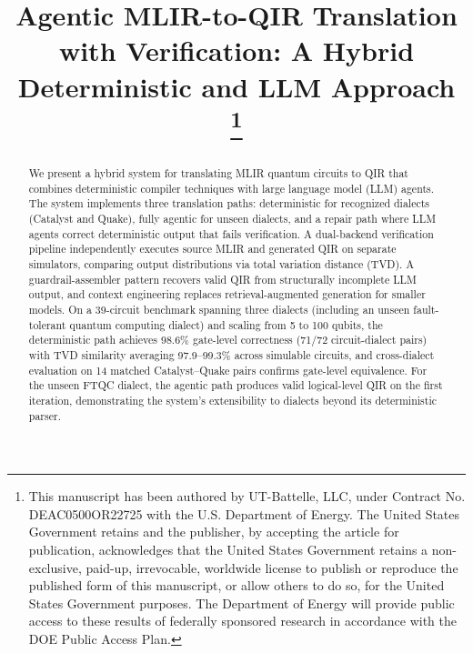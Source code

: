 \documentclass[conference]{IEEEtran}
\begin{document}
\title{Agentic MLIR-to-QIR Translation with Verification: A Hybrid Deterministic and LLM Approach
\thanks{This manuscript has been authored by UT-Battelle, LLC, under Contract No. DEAC0500OR22725 with the U.S. Department of Energy. The United States Government
retains and the publisher, by accepting the article for publication, acknowledges that
the United States Government retains a non-exclusive, paid-up, irrevocable, worldwide license to publish or reproduce the published form of this manuscript, or allow
others to do so, for the United States Government purposes. The Department of
Energy will provide public access to these results of federally sponsored research in
accordance with the DOE Public Access Plan.}}

\author{
}

\maketitle

\begin{abstract}
We present a hybrid system for translating MLIR quantum circuits to QIR that combines deterministic compiler techniques with large language model (LLM) agents. The system implements three translation paths: deterministic for recognized dialects (Catalyst and Quake), fully agentic for unseen dialects, and a repair path where LLM agents correct deterministic output that fails verification. A dual-backend verification pipeline independently executes source MLIR and generated QIR on separate simulators, comparing output distributions via total variation distance (TVD). A guardrail-assembler pattern recovers valid QIR from structurally incomplete LLM output, and context engineering replaces retrieval-augmented generation for smaller models. On a 39-circuit benchmark spanning three dialects (including an unseen fault-tolerant quantum computing dialect) and scaling from 5 to 100 qubits, the deterministic path achieves 98.6\% gate-level correctness (71/72 circuit-dialect pairs) with TVD similarity averaging 97.9--99.3\% across simulable circuits, and cross-dialect evaluation on 14 matched Catalyst--Quake pairs confirms gate-level equivalence. For the unseen FTQC dialect, the agentic path produces valid logical-level QIR on the first iteration, demonstrating the system's extensibility to dialects beyond its deterministic parser.
\end{abstract}
\end{document}
